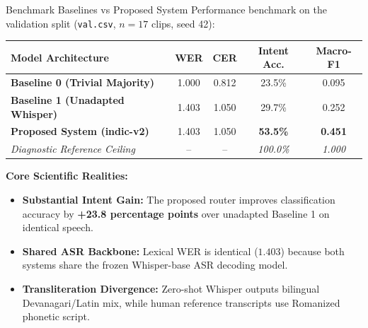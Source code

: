 \documentclass[10pt]{beamer}
\begin{document}
\begin{frame}{Benchmark Baselines vs Proposed System}
    \footnotesize
    Performance benchmark on the validation split (\texttt{val.csv}, $n=17$ clips, seed 42):\\[3pt]

    \begin{table}[htbp]
    \centering
    \footnotesize
    \begin{tabular}{lcccc}
        \toprule
        \textbf{Model Architecture} & \textbf{WER} & \textbf{CER} & \textbf{Intent Acc.} & \textbf{Macro-F1} \\
        \midrule
        \textbf{Baseline 0 (Trivial Majority)} & 1.000 & 0.812 & 23.5\% & 0.095 \\
        \textbf{Baseline 1 (Unadapted Whisper)} & 1.403 & 1.050 & 29.7\% & 0.252 \\
        \textbf{Proposed System (indic-v2)} & 1.403 & 1.050 & \textbf{53.5\%} & \textbf{0.451} \\
        \midrule
        \textit{Diagnostic Reference Ceiling} & -- & -- & \textit{100.0\%} & \textit{1.000} \\
        \bottomrule
    \end{tabular}
    \end{table}

    \vspace{3pt}
    \textbf{Core Scientific Realities:}\\[2pt]
    \begin{itemize}\setlength{\itemsep}{2pt}
        \item \textbf{Substantial Intent Gain:} The proposed router improves classification accuracy by \textbf{+23.8 percentage points} over unadapted Baseline 1 on identical speech.
        \item \textbf{Shared ASR Backbone:} Lexical WER is identical ($1.403$) because both systems share the frozen Whisper-base ASR decoding model.
        \item \textbf{Transliteration Divergence:} Zero-shot Whisper outputs bilingual Devanagari/Latin mix, while human reference transcripts use Romanized phonetic script.
    \end{itemize}
\end{frame}
\end{document}
